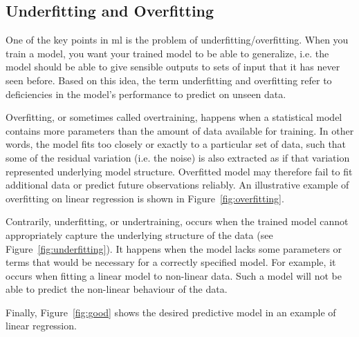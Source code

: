\documentclass[parskip=half,notes,cadrem,toolver]{iisvlsi}
\begin{document}
\subsection{Underfitting and Overfitting}
One of the key points in \gls{ml} is the problem of underfitting/overfitting. When you train a model, you want your trained model to be able to generalize, i.e. the model should be able to give sensible outputs to sets of input that it has never seen before. Based on this idea, the term underfitting and overfitting refer to deficiencies in the model’s performance to predict on unseen data.

Overfitting, or sometimes called overtraining, happens when a statistical model contains more parameters than the amount of data available for training. In other words, the model fits too closely or exactly to a particular set of data, such that some of the residual variation (i.e. the noise) is also extracted as if that variation represented underlying model structure. Overfitted model may therefore fail to fit additional data or predict future observations reliably. An illustrative example of overfitting on linear regression is shown in Figure~\ref{fig:overfitting}.

Contrarily, underfitting, or undertraining, occurs when the trained model cannot appropriately capture the underlying structure of the data (see Figure~\ref{fig:underfitting}). It happens when the model lacks some parameters or terms that would be necessary for a correctly specified model. For example, it occurs when fitting a linear model to non-linear data. Such a model will not be able to predict the non-linear behaviour of the data.

Finally, Figure~\ref{fig:good} shows the desired predictive model in an example of linear regression.
\end{document}
